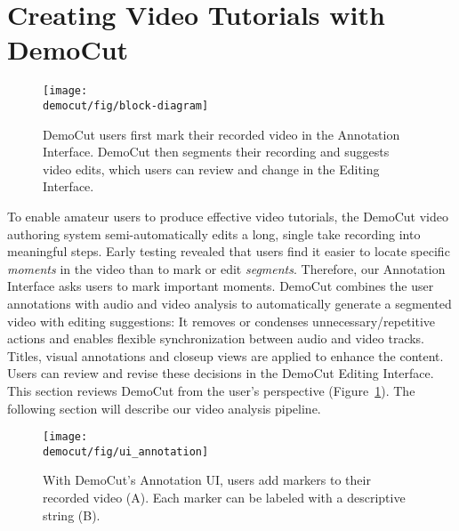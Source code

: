 \section{Creating Video Tutorials with DemoCut}

\begin{figure}[b!]
  \centering
  \texttt{[image: \\democut/fig/block-diagram]}
  \caption{DemoCut users first mark their recorded video in the Annotation Interface. DemoCut then segments their recording and suggests video edits, which users can review and change in the Editing Interface.}
  \label{fig:block-diagram}
\end{figure}

To enable amateur users to produce effective video tutorials, the DemoCut video authoring system semi-automatically edits a long, single take recording into meaningful steps.
Early testing revealed that users find it easier to locate specific {\em moments} in the video than to mark or edit {\em segments}. Therefore, our Annotation Interface asks users to mark important moments.
%
DemoCut combines the user annotations with audio and video analysis to automatically generate a segmented video with editing suggestions:
%
It removes or condenses unnecessary/repetitive actions and enables flexible synchronization between audio and video tracks.
Titles, visual annotations and closeup views are applied to enhance the content.
%
Users can review and revise these decisions in the DemoCut Editing Interface.
This section reviews DemoCut from the user's perspective (Figure~\ref{fig:block-diagram}). The following section will describe our video analysis pipeline.

\begin{figure*}[t!]
  \centering
  \texttt{[image: \\democut/fig/ui\_annotation]}
  \caption{With DemoCut's Annotation UI, users add markers to their recorded video (A). Each marker can be labeled with a descriptive string (B).}
  \label{fig:ui_annotation}
\end{figure*}

